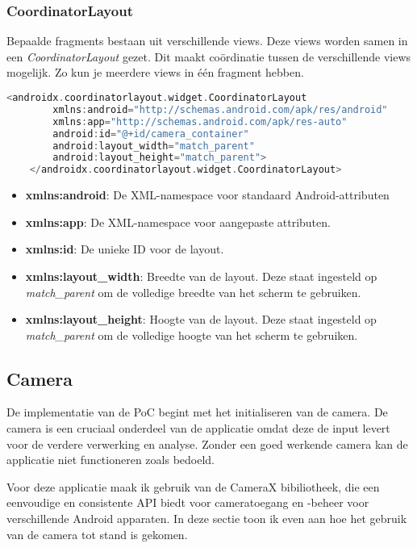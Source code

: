 \subsubsection{CoordinatorLayout}
Bepaalde fragments bestaan uit verschillende views. Deze views worden samen in een  \emph{CoordinatorLayout} gezet. Dit maakt coördinatie tussen de verschillende views mogelijk. Zo kun je meerdere views in één fragment hebben.
\begin{lstlisting}[language=Kotlin, caption=CoordinatorLayout]
    <androidx.coordinatorlayout.widget.CoordinatorLayout
        xmlns:android="http://schemas.android.com/apk/res/android"
        xmlns:app="http://schemas.android.com/apk/res-auto"
        android:id="@+id/camera_container"
        android:layout_width="match_parent"
        android:layout_height="match_parent">
    </androidx.coordinatorlayout.widget.CoordinatorLayout>
\end{lstlisting}

\begin{itemize}
    \item \textbf{xmlns:android}: De XML-namespace voor standaard Android-attributen
    \item \textbf{xmlns:app}: De XML-namespace voor aangepaste attributen.
    \item \textbf{xmlns:id}: De unieke ID voor de layout.
    \item \textbf{xmlns:layout\_width}: Breedte van de layout. Deze staat ingesteld op \emph{match\_parent} om de volledige breedte van het scherm te gebruiken.
    \item \textbf{xmlns:layout\_height}: Hoogte van de layout. Deze staat ingesteld op \emph{match\_parent} om de volledige hoogte van het scherm te gebruiken.
\end{itemize}


\subsection{Camera}
De implementatie van de PoC begint met het initialiseren van de camera. De camera is een cruciaal onderdeel van de applicatie omdat deze de input levert voor de verdere verwerking en analyse. Zonder een goed werkende camera kan de applicatie niet functioneren zoals bedoeld.

Voor deze applicatie maak ik gebruik van de CameraX bibiliotheek, die een eenvoudige en consistente API biedt voor cameratoegang en -beheer voor verschillende Android apparaten. In deze sectie toon ik even aan hoe het gebruik van de camera tot stand is gekomen.


